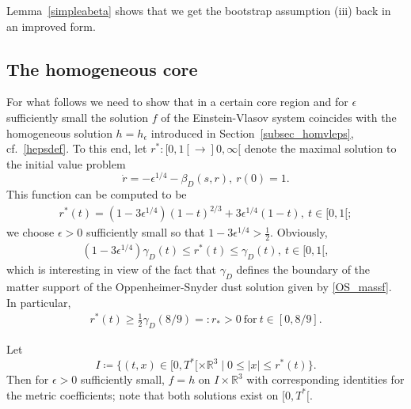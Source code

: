 \documentclass[11pt]{article}
\def\R{\mathbb R}
\begin{document}
Lemma~\ref{simpleabeta} shows that we get the bootstrap assumption (iii)
back in an improved form.
%
%
\subsection{The homogeneous core}
%
%
For what follows we need to show that in a certain core region
and for $\epsilon$ sufficiently small
the solution $f$ of the Einstein-Vlasov system coincides with
the homogeneous solution $h= h_\epsilon$ introduced in
Section~\ref{subsec_homvleps}, cf.~\eqref{hepsdef}. To this end, let
$r^\ast \colon [0,1[\to ]0,\infty[$ denote the maximal solution to
the initial value problem 
\[
\dot r = - \epsilon^{1/4} - \beta_D(s,r),\ r(0)=1.
\]
This function can be computed to be
\begin{align}\label{rstar}
  r^\ast(t) = (1-3\epsilon^{1/4})(1-t)^{2/3} + 3\epsilon^{1/4} (1-t),\ t\in [0,1[;
\end{align}
we choose $\epsilon>0$ sufficiently small so that
$1-3\epsilon^{1/4} > \frac{1}{2}$.
Obviously,
\begin{align}\label{rstarest}
(1-3\epsilon^{1/4}) \gamma_D(t) \leq  r^\ast(t) \leq \gamma_D(t),\ t\in [0,1[,
\end{align}
which is interesting in view of the fact that $\gamma_D$ defines the
boundary of the matter support of the Oppenheimer-Snyder dust solution
given by \eqref{OS_massf}. In particular,
\begin{align}\label{lowr}
  r^\ast(t) \geq \frac{1}{2} \gamma_D(8/9) =: r_\ast >0 \ \mbox{for}\
  t\in [0,8/9].
\end{align}
%
\begin{lemma}\label{homcore}
  Let
  \[
  I \coloneqq \{(t,x)\in [0,T^\ast[ \times \R^3 \mid 0\leq |x|\leq r^\ast(t)\}.
  \]
  Then for $\epsilon>0$ sufficiently small,
  $f=h$ on $I\times \R^3$ with corresponding identities
  for the metric coefficients; note that both solutions exist on
  $[0,T^\ast[$.
\end{lemma}
\end{document}
